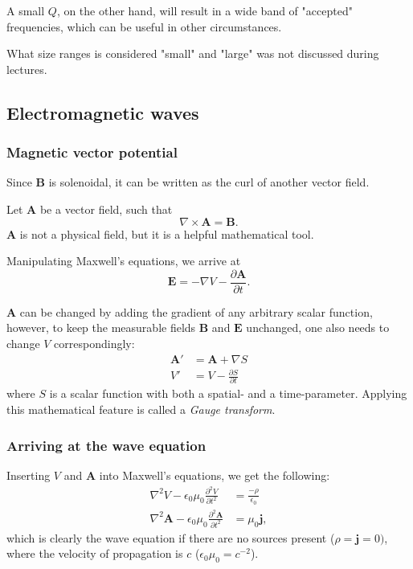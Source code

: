 \documentclass[a4paper, 12pt]{article}
\renewcommand{\vec}[1]{\mathbf{#1}}
\newcommand{\E}{\ensuremath{\vec{E}}}
\newcommand{\e}{\ensuremath{\epsilon_0}}
\renewcommand{\j}{\ensuremath{\vec{j}}}
\newcommand{\B}{\ensuremath{\vec{B}}}
\begin{document}
            A small $Q$, on the other hand, will result in a wide band of "accepted" frequencies, which can be useful in other circumstances.
        
            What size ranges is considered "small" and "large" was not discussed during lectures. 
    \subsection{Electromagnetic waves}
        \subsubsection{Magnetic vector potential}
            Since \B{} is solenoidal, it can be written as the curl of another vector field. 
            
            Let $\vec{A}$ be a vector field, such that
            \begin{equation}
                \nabla \times \vec{A} = \B.
            \end{equation}
            $\vec{A}$ is not a physical field, but it is a helpful mathematical tool. 

            Manipulating Maxwell's equations, we arrive at 
            \begin{equation}
                \E = -\nabla V - \frac{\partial \vec{A}}{\partial t}.
            \end{equation}
            
            $\vec{A}$ can be changed by adding the gradient of any arbitrary scalar function, 
            however, to keep the measurable fields \B{} and \E{} unchanged, one also needs to change $V$ correspondingly:
            \begin{align*}
                \vec{A}' &= \vec{A} + \nabla S \\
                V' &= V - \frac{\partial S}{\partial t}
            \end{align*}
            where $S$ is a scalar function with both a spatial- and a time-parameter.
            Applying this mathematical feature is called a \textit{Gauge transform}.
        \subsubsection{Arriving at the wave equation}
            Inserting $V$ and $\vec{A}$ into Maxwell's equations, we get the following: 
            \begin{align*}
                \nabla^2V - \e\mu_0\frac{\partial^2V}{\partial t^2} &= \frac{-\rho}{\e}\\
                \nabla^2\vec{A} - \e\mu_0\frac{\partial^2\vec{A}}{\partial t^2} &= \mu_0\j,
            \end{align*}
            which is clearly the wave equation if there are no sources present ($\rho = \j = 0)$, 
            where the velocity of propagation is $c$ ($\e\mu_0 = c^{-2}$).
\end{document}
